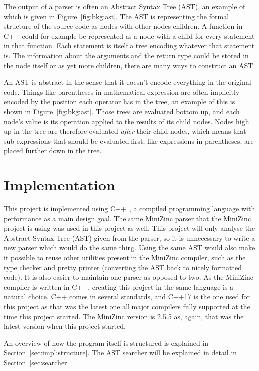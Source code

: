 \documentclass[a4paper,12pt]{article}
\begin{document}
The output of a parser is often an Abstract Syntax Tree (AST), an example of which is
given in Figure~\ref{fig:bkg:ast}. The AST is representing the formal structure of the
source code as nodes with other nodes children. A function in C++ could for example be
represented as a node with a child for every statement in that function. Each statement is
itself a tree encoding whatever that statement is. The information
about the arguments and the return type could be stored in the node itself or as yet more
children, there are many ways to construct an AST.

An AST is abstract in the sense that it doesn't encode everything in the original code.
Things like parentheses in mathematical expression are often implicitly encoded by the
position each operator has in the tree, an example of this is shown in
Figure~\ref{fig:bkg:ast}. Those trees are evaluated bottom up, and each node's value is
its operation applied to the results of its child nodes. Nodes high up in the tree are
therefore evaluated \emph{after} their child nodes, which means that sub-expressions that
should be evaluated first, like expressions in parentheses, are placed further down in the
tree.



\section{Implementation}\label{sec:impl}
This project is implemented using C++~\cite{cpp}, a compiled programming language with
performance as a main design goal. The same MiniZinc parser that the MiniZinc project is
using was used in this project as well. This project will only analyse the Abstract Syntax
Tree (AST) given from the parser, so it is unnecessary to write a new parser which would
do the same thing. Using the same AST would also make it possible to reuse other utilities
present in the MiniZinc compiler, such as the type checker and pretty printer (converting
the AST back to nicely formatted code). It is also easier to maintain one parser as
opposed to two. As the MiniZinc compiler is written in C++, creating this project in the
same language is a natural choice. C++ comes in several standards, and C++17 is the one
used for this project as that was the latest one all major compilers fully supported at
the time this project started. The MiniZinc version is 2.5.5 as, again, that was the
latest version when this project started.

An overview of how the program itself is structured is explained in
Section~\ref{sec:impl:structure}. The AST searcher will be explained in detail in
Section~\ref{sec:searcher}.
\end{document}
